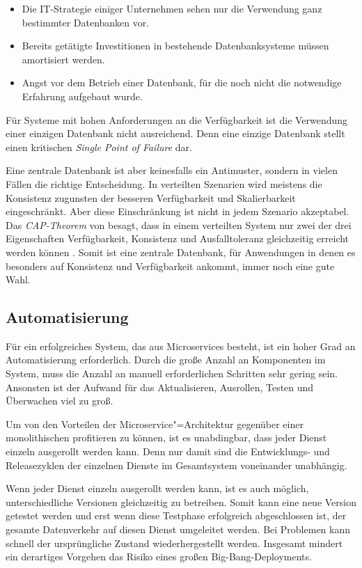 \begin{itemize}
  \item Die IT-Strategie einiger Unternehmen sehen nur die Verwendung ganz bestimmter Datenbanken vor.
	\item Bereits getätigte Investitionen in bestehende Datenbanksysteme müssen amortisiert werden.
	\item Angst vor dem Betrieb einer Datenbank, für die noch nicht die notwendige Erfahrung aufgebaut wurde.
\end{itemize}

Für Systeme mit hohen Anforderungen an die Verfügbarkeit ist die Verwendung einer einzigen Datenbank nicht ausreichend. Denn eine einzige Datenbank stellt einen kritischen \textit{Single Point of Failure} dar.

Eine zentrale Datenbank ist aber keinesfalls ein Antimuster, sondern in vielen Fällen die richtige Entscheidung. In verteilten Szenarien wird meistens die Konsistenz zugunsten der besseren Verfügbarkeit und Skalierbarkeit eingeschränkt. Aber diese Einschränkung ist nicht in jedem Szenario akzeptabel. Das \textit{CAP-Theorem} von \citeauthor{Brewer:2000:TRD:343477.343502} besagt, dass in einem verteilten System nur zwei der drei Eigenschaften Verfügbarkeit, Konsistenz und Ausfalltoleranz gleichzeitig erreicht werden können \cite{Brewer:2000:TRD:343477.343502}. Somit ist eine zentrale Datenbank, für Anwendungen in denen es besonders auf Konsistenz und Verfügbarkeit ankommt, immer noch eine gute Wahl.

\subsection{Automatisierung}

Für ein erfolgreiches System, das aus Microservices besteht, ist ein hoher Grad an Automatisierung erforderlich. Durch die große Anzahl an Komponenten im System, muss die Anzahl an manuell erforderlichen Schritten sehr gering sein. Ansonsten ist der Aufwand für das Aktualisieren, Ausrollen, Testen und Überwachen viel zu groß.

Um von den Vorteilen der Microservice"=Architektur gegenüber einer monolithischen profitieren zu können, ist es unabdingbar, dass jeder Dienst einzeln ausgerollt werden kann. Denn nur damit sind die Entwicklungs- und Releasezyklen der einzelnen Dienste im Gesamtsystem voneinander unabhängig.

Wenn jeder Dienst einzeln ausgerollt werden kann, ist es auch möglich, unterschiedliche Versionen gleichzeitig zu betreiben. Somit kann eine neue Version getestet werden und erst wenn diese Testphase erfolgreich abgeschlossen ist, der gesamte Datenverkehr auf diesen Dienst umgeleitet werden. Bei Problemen kann schnell der ursprüngliche Zustand wiederhergestellt werden. Insgesamt mindert ein derartiges Vorgehen das Risiko eines großen Big-Bang-Deployments.

